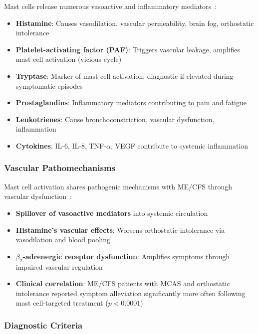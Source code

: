 Mast cells release numerous vasoactive and inflammatory mediators~\cite{Wirth2023}:
\begin{itemize}
    \item \textbf{Histamine}: Causes vasodilation, vascular permeability, brain fog, orthostatic intolerance
    \item \textbf{Platelet-activating factor (PAF)}: Triggers vascular leakage, amplifies mast cell activation (vicious cycle)
    \item \textbf{Tryptase}: Marker of mast cell activation; diagnostic if elevated during symptomatic episodes
    \item \textbf{Prostaglandins}: Inflammatory mediators contributing to pain and fatigue
    \item \textbf{Leukotrienes}: Cause bronchoconstriction, vascular dysfunction, inflammation
    \item \textbf{Cytokines}: IL-6, IL-8, TNF-$\alpha$, VEGF contribute to systemic inflammation
\end{itemize}

\subsubsection{Vascular Pathomechanisms}

Mast cell activation shares pathogenic mechanisms with ME/CFS through vascular dysfunction~\cite{Wirth2023}:
\begin{itemize}
    \item \textbf{Spillover of vasoactive mediators} into systemic circulation
    \item \textbf{Histamine's vascular effects}: Worsens orthostatic intolerance via vasodilation and blood pooling
    \item \textbf{$\beta_2$-adrenergic receptor dysfunction}: Amplifies symptoms through impaired vascular regulation
    \item \textbf{Clinical correlation}: ME/CFS patients with MCAS and orthostatic intolerance reported symptom alleviation significantly more often following mast cell-targeted treatment ($p<0.0001$)~\cite{Wirth2023}
\end{itemize}

\subsubsection{Diagnostic Criteria}

